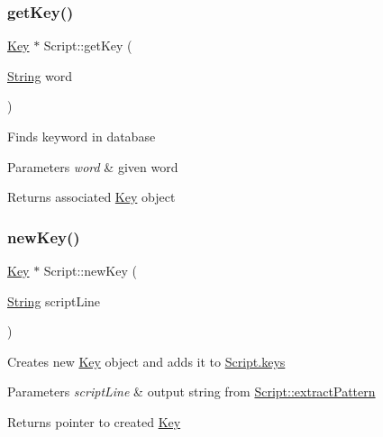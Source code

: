 \subsubsection{\texorpdfstring{get\+Key()}{getKey()}}
{\footnotesize\ttfamily \mbox{\hyperlink{classKey}{Key}} $\ast$ Script\+::get\+Key (\begin{DoxyParamCaption}\item[{\mbox{\hyperlink{classString}{String}}}]{word }\end{DoxyParamCaption})}

Finds keyword in database 
\begin{DoxyParams}{Parameters}
{\em word} & given word \\
\hline
\end{DoxyParams}
\begin{DoxyReturn}{Returns}
associated \mbox{\hyperlink{classKey}{Key}} object 
\end{DoxyReturn}
\mbox{\label{classScript_a5edeec2fa0d7e46e0795715810a031d8}} 
\subsubsection{\texorpdfstring{new\+Key()}{newKey()}}
{\footnotesize\ttfamily \mbox{\hyperlink{classKey}{Key}} $\ast$ Script\+::new\+Key (\begin{DoxyParamCaption}\item[{\mbox{\hyperlink{classString}{String}}}]{script\+Line }\end{DoxyParamCaption})\hspace{0.3cm}{\ttfamily [private]}}

Creates new \mbox{\hyperlink{classKey}{Key}} object and adds it to \mbox{\hyperlink{classScript_ad1fcd3868d74927bd60118f0e4eaf574}{Script.\+keys}} 
\begin{DoxyParams}{Parameters}
{\em script\+Line} & output string from \mbox{\hyperlink{classScript_a946d037839b4caada09e22a428c8f42e}{Script\+::extract\+Pattern}} \\
\hline
\end{DoxyParams}
\begin{DoxyReturn}{Returns}
pointer to created \mbox{\hyperlink{classKey}{Key}} 
\end{DoxyReturn}
\mbox{\label{classScript_a4bb2f5d77aed84a9f0dc9298894abd1c}} 
